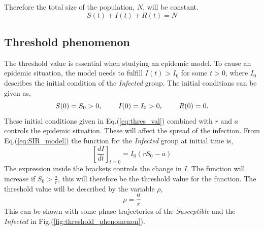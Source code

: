 \documentclass[%
twoside,                 %
final,                   %
10pt]{article}
\begin{document}
Therefore the total size of the population, $N$, will be constant. 
\begin{equation} \label{eq:SIR_N}
S(t)+I(t)+R(t) = N
\end{equation}

\subsection{Threshold phenomenon}
The threshold value is essential when studying an epidemic model. To cause an epidemic situation, the model needs to fulfill $I(t)> I_0$ for some $t>0$, where $I_0$ describes the initial condition of  the \emph{Infected} group. The initial conditions can be given as,
\begin{equation} \label{eq:thres_val}
S(0)=S_0 > 0,\hspace{8mm} I(0)=I_0>0,\hspace{8mm} R(0) =0.
\end{equation}
These initial conditions given in Eq.(\ref{eq:thres_val}) combined with $r$ and $a$ controls the epidemic situation. These will affect the spread of the infection. From Eq.(\ref{eq:SIR_model}) the function for the \emph{Infected} group at initial time is,
\begin{equation}
\left[\frac{dI}{dt}\right]_{t=0} = I_0(rS_0-a)
\end{equation}
The expression inside the brackets controls the change in $I$. The function will increase if $S_0 > \frac{a}{r}$, this will therefore be the threshold value for the function. The threshold value will be described by the variable $\rho$,
\begin{equation} \label{eq:threshold_value}
\rho = \frac{a}{r}
\end{equation}
This can be shown with some phase trajectories of the \emph{Susceptible} and the \emph{Infected} in Fig.(\ref{fig:threshold_phenomenon}).  
\end{document}
